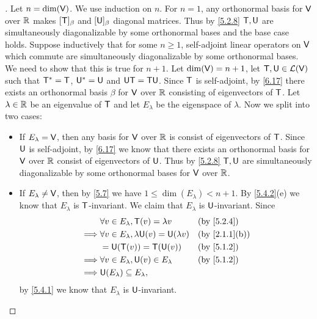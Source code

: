 \begin{proof}[]
  Let \(n = \dim(\mathsf{V})\).
  We use induction on \(n\).
  For \(n = 1\), any orthonormal basis for \(\mathsf{V}\) over \(\mathbb{R}\) makes \([\mathsf{T}]_{\beta}\) and \([\mathsf{U}]_{\beta}\) diagonal matrices.
  Thus by \cref{5.2.8} \(\mathsf{T}, \mathsf{U}\) are simultaneously diagonalizable by some orthonormal bases and the base case holds.
  Suppose inductively that for some \(n \geq 1\), self-adjoint linear operators on \(\mathsf{V}\) which commute are simultaneously diagonalizable by some orthonormal bases.
  We need to show that this is true for \(n + 1\).
  Let \(\dim(\mathsf{V}) = n + 1\), let \(\mathsf{T}, \mathsf{U} \in \mathcal{L}(\mathsf{V})\) such that \(\mathsf{T}^* = \mathsf{T}\), \(\mathsf{U}^* = \mathsf{U}\) and \(\mathsf{U} \mathsf{T} = \mathsf{T} \mathsf{U}\).
  Since \(\mathsf{T}\) is self-adjoint, by \cref{6.17} there exists an orthonormal basis \(\beta\) for \(\mathsf{V}\) over \(\mathbb{R}\) consisting of eigenvectors of \(\mathsf{T}\).
  Let \(\lambda \in \mathbb{R}\) be an eigenvalue of \(\mathsf{T}\) and let \(E_{\lambda}\) be the eigenspace of \(\lambda\).
  Now we split into two cases:
  \begin{itemize}
    \item If \(E_{\lambda} = \mathsf{V}\), then any basis for \(\mathsf{V}\) over \(\mathbb{R}\) is consist of eigenvectors of \(\mathsf{T}\).
          Since \(\mathsf{U}\) is self-adjoint, by \cref{6.17} we know that there exists an orthonormal basis for \(\mathsf{V}\) over \(\mathbb{R}\) consist of eigenvectors of \(\mathsf{U}\).
          Thus by \cref{5.2.8} \(\mathsf{T}, \mathsf{U}\) are simultaneously diagonalizable by some orthonormal bases for \(\mathsf{V}\) over \(\mathbb{R}\).
    \item If \(E_{\lambda} \neq \mathsf{V}\), then by \cref{5.7} we have \(1 \leq \dim(E_{\lambda}) < n + 1\).
          By \cref{5.4.2}(e) we know that \(E_{\lambda}\) is \(\mathsf{T}\)-invariant.
          We claim that \(E_{\lambda}\) is \(\mathsf{U}\)-invariant.
          Since
          \begin{align*}
                     & \forall v \in E_{\lambda}, \T(v) = \lambda v             &  & \by{5.2.4}    \\
            \implies & \forall v \in E_{\lambda}, \lambda \U(v) = \U(\lambda v) &  & \by{2.1.1}[b] \\
                     & = \U(\T(v)) = \T(\U(v))                                  &  & \by{5.1.2}    \\
            \implies & \forall v \in E_{\lambda}, \U(v) \in E_{\lambda}         &  & \by{5.1.2}    \\
            \implies & \U(E_{\lambda}) \subseteq E_{\lambda},
          \end{align*}
          by \cref{5.4.1} we know that \(E_{\lambda}\) is \(\mathsf{U}\)-invariant.

\end{itemize}
\end{proof}
